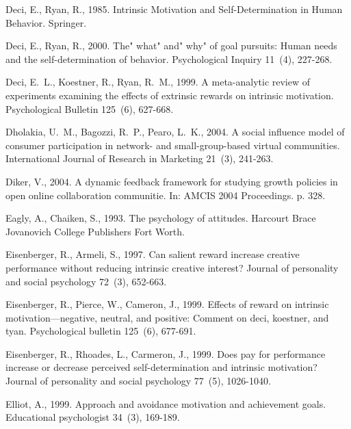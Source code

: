 \documentclass[doublespacing]{elsarticle}
\begin{document}
\begin{thebibliography}{52}
Deci, E., Ryan, R., 1985. Intrinsic Motivation and Self-Determination in Human
  Behavior. Springer.

Deci, E., Ryan, R., 2000. The" what" and" why" of goal pursuits: Human needs
  and the self-determination of behavior. Psychological Inquiry 11~(4),
  227-268.

Deci, E.~L., Koestner, R., Ryan, R.~M., 1999. A meta-analytic review of
  experiments examining the effects of extrinsic rewards on intrinsic
  motivation. Psychological Bulletin 125~(6), 627-668.

Dholakia, U.~M., Bagozzi, R.~P., Pearo, L.~K., 2004. A social influence model
  of consumer participation in network- and small-group-based virtual
  communities. International Journal of Research in Marketing 21~(3), 241-263.

Diker, V., 2004. A dynamic feedback framework for studying growth policies in
  open online collaboration communitie. In: AMCIS 2004 Proceedings. p. 328.

Eagly, A., Chaiken, S., 1993. {The psychology of attitudes}. Harcourt Brace
  Jovanovich College Publishers Fort Worth.

Eisenberger, R., Armeli, S., 1997. Can salient reward increase creative
  performance without reducing intrinsic creative interest? Journal of
  personality and social psychology 72~(3), 652-663.

Eisenberger, R., Pierce, W., Cameron, J., 1999{}. Effects of reward
  on intrinsic motivation—negative, neutral, and positive: Comment on deci,
  koestner, and tyan. Psychological bulletin 125~(6), 677-691.

Eisenberger, R., Rhoades, L., Carmeron, J., 1999{}. Does pay for
  performance increase or decrease perceived self-determination and intrinsic
  motivation? Journal of personality and social psychology 77~(5), 1026-1040.

Elliot, A., 1999. {Approach and avoidance motivation and achievement goals}.
  Educational psychologist 34~(3), 169-189.


\end{thebibliography}
\end{document}
